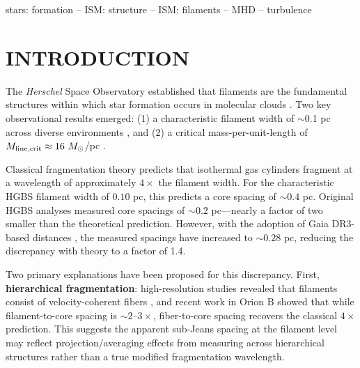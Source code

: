 \documentclass[twocolumn,longtitle,usenatbib]{mnras}
\begin{document}
\begin{abstract}
\textbf{Implications}. The failure of ideal isothermal MHD under realistic conditions suggests that missing physics---non-ideal MHD effects, time-dependent thermodynamics, or hierarchical fiber fragmentation---is required to explain HGBS core spacings. Resolving whether filaments fragment at the classical $4\times$ scale requires: (1) proper nearest-neighbour analysis with HGBS skeleton data; (2) field geometry measurements at fragmentation scales; (3) bridging the extrapolation gap ($f \approx 1.2$--$1.5$); (4) assessment of non-ideal MHD effects.
\end{abstract}

\begin{keywords}
stars: formation -- ISM: structure -- ISM: filaments -- MHD -- turbulence
\end{keywords}


\section{INTRODUCTION}

The \textit{Herschel} Space Observatory established that filaments are the fundamental structures within which star formation occurs in molecular clouds \citep{Andre2010}. Two key observational results emerged: (1) a characteristic filament width of $\sim$0.1 pc across diverse environments \citep{Arzoumanian2011}, and (2) a critical mass-per-unit-length of $M_{\rm line,crit} \approx 16~M_\odot$/pc \citep{Ostriker1964}.

Classical fragmentation theory \citep{Inutsuka1992} predicts that isothermal gas cylinders fragment at a wavelength of approximately $4\times$ the filament width. For the characteristic HGBS filament width of $0.10$ pc, this predicts a core spacing of $\sim0.4$ pc. Original HGBS analyses measured core spacings of $\sim0.2$ pc—nearly a factor of two smaller than the theoretical prediction. However, with the adoption of Gaia DR3-based distances \citep{Zhang2023}, the measured spacings have increased to $\sim0.28$ pc, reducing the discrepancy with theory to a factor of 1.4.

Two primary explanations have been proposed for this discrepancy. First, \textbf{hierarchical fragmentation}: high-resolution studies revealed that filaments consist of velocity-coherent fibers \citep{Hacar2013}, and recent work in Orion B \citep{Yang2024} showed that while filament-to-core spacing is $\sim2$--$3\times$, fiber-to-core spacing recovers the classical $4\times$ prediction. This suggests the apparent sub-Jeans spacing at the filament level may reflect projection/averaging effects from measuring across hierarchical structures rather than a true modified fragmentation wavelength.
\end{document}
